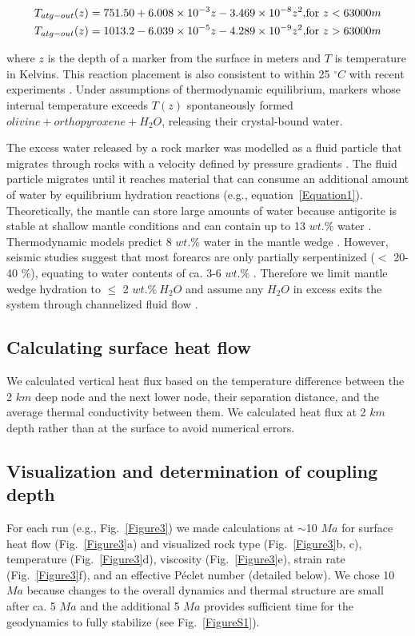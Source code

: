 \documentclass[draft]{assets/agujournal2019}
\begin{document}
\begin{equation}
 \begin{alignedat}{2}
  T_{atg-out}(z) &= 751.50+\num{6.008d-3}z-\num{3.469d-8}z^2, && \text{for $z<63000m$} \\
  T_{atg-out}(z) &= 1013.2-\num{6.039d-5}z-\num{4.289d-9}z^2, && \text{for $z>63000m$}
 \end{alignedat}
 \label{Equation1}
\end{equation}

where $z$ is the depth of a marker from the surface in meters and $T$ is temperature in Kelvins. This reaction placement is also consistent to within 25 $^{\circ}C$ with recent experiments \cite{Shen2015}. Under assumptions of thermodynamic equilibrium, markers whose internal temperature exceeds $T(z)$  spontaneously formed $olivine \allowbreak+ orthopyroxene \allowbreak+ H_2O$, releasing their crystal-bound water.

The excess water released by a rock marker was modelled as a fluid particle that migrates through rocks with a velocity defined by pressure gradients \cite[see Appendix A]{Faccenda2009}. The fluid particle migrates until it reaches material that can consume an additional amount of water by equilibrium  hydration reactions (e.g., equation~\ref{Equation1}). Theoretically, the mantle can store large amounts of water because antigorite is stable at shallow mantle conditions and can contain up to 13 $wt.\%$ water \cite{Reynard2013}. Thermodynamic models predict 8 $wt.\%$ water in the mantle wedge \cite{Connolly2005}. However, seismic studies suggest that most forearcs are only partially serpentinized ($<$ 20-40 $\%$), equating to water contents of ca. 3-6 $wt.\%$ \cite{Abers2017, Carlson2003}. Therefore we limit mantle wedge hydration to $\leq$ 2 $wt.\% ~H_2O$ and assume any $H_2O$ in excess exits the system through channelized fluid flow \cite{Davies1999}.

\subsection{Calculating surface heat flow}
We calculated vertical heat flux based on the temperature difference between the 2 $km$ deep node and the next lower node, their separation distance, and the average thermal conductivity between them. We calculated heat flux at 2 $km$ depth rather than at the surface to avoid numerical errors.

\subsection{Visualization and determination of coupling depth}
For each run (e.g., Fig.~\ref{Figure3}) we made calculations at $\sim$10 $Ma$ for surface heat flow (Fig.~\ref{Figure3}a) and visualized rock type (Fig.~\ref{Figure3}b, c), temperature (Fig.~\ref{Figure3}d), viscosity (Fig.~\ref{Figure3}e), strain rate (Fig.~\ref{Figure3}f), and an effective P\'{e}clet number (detailed below). We chose 10 $Ma$ because changes to the overall dynamics and thermal structure are small after ca. 5 $Ma$ and the additional 5 $Ma$ provides sufficient time for the geodynamics to fully stabilize (see Fig.~\ref{FigureS1}).
\end{document}
